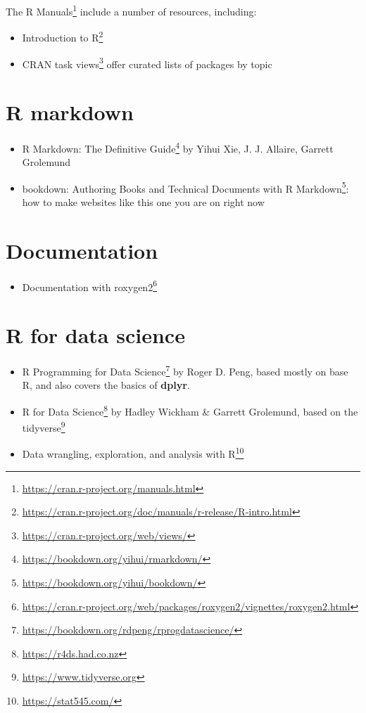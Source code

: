 \documentclass[
]{book}
\DeclareRobustCommand{\href}[2]{#2\footnote{\url{#1}}}
\providecommand{\tightlist}{%
  \setlength{\itemsep}{0pt}\setlength{\parskip}{0pt}}
\begin{document}
\href{https://cran.r-project.org/manuals.html}{The R Manuals} include a number of resources, including:

\begin{itemize}
\tightlist
\item
  \href{https://cran.r-project.org/doc/manuals/r-release/R-intro.html}{Introduction to R}
\item
  \href{https://cran.r-project.org/web/views/}{CRAN task views} offer curated lists of packages by topic
\end{itemize}

\hypertarget{r-markdown}{%
\section{R markdown}\label{r-markdown}}

\begin{itemize}
\tightlist
\item
  \href{https://bookdown.org/yihui/rmarkdown/}{R Markdown: The Definitive Guide} by Yihui Xie, J. J. Allaire, Garrett Grolemund
\item
  \href{https://bookdown.org/yihui/bookdown/}{bookdown: Authoring Books and Technical Documents with R Markdown}: how to make websites like this one you are on right now
\end{itemize}

\hypertarget{documentation}{%
\section{Documentation}\label{documentation}}

\begin{itemize}
\tightlist
\item
  \href{https://cran.r-project.org/web/packages/roxygen2/vignettes/roxygen2.html}{Documentation with roxygen2}
\end{itemize}

\hypertarget{r-for-data-science}{%
\section{R for data science}\label{r-for-data-science}}

\begin{itemize}
\tightlist
\item
  \href{https://bookdown.org/rdpeng/rprogdatascience/}{R Programming for Data Science} by Roger D. Peng, based mostly on base R, and also covers the basics of \textbf{dplyr}.
\item
  \href{https://r4ds.had.co.nz}{R for Data Science} by Hadley Wickham \& Garrett Grolemund, based on the \href{https://www.tidyverse.org}{tidyverse}
\item
  \href{https://stat545.com/}{Data wrangling, exploration, and analysis with R}
\end{itemize}
\end{document}
